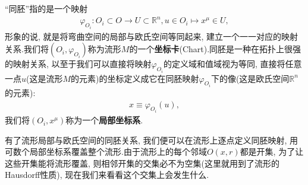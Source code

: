 \begin{remark}
  “同胚”指的是一个映射
  \begin{equation}
    \begin{split}
      \varphi_{O_i}:O_i\subset O\rightarrow U\subset \mathbb{R}^n,u\in O_i\mapsto x^\mu\in U,
    \end{split}
  \end{equation}
  形象的说, 就是将弯曲空间的局部与欧氏空间等同起来, 建立一个一一对应的映射关系.我们将$(O_i,\varphi_{O_i})$称为流形$M$的一个\textbf{坐标卡}(Chart).同胚是一种在拓扑上很强的映射关系, 以至于我们可以直接将映射$\varphi_{O_i}$的定义域和值域视为等同, 直接将任意一点$u$(这是流形$M$的元素)的坐标定义成它在同胚映射$\varphi_{O_i}$下的像(这是欧氏空间$\mathbb{R}^n$的元素):
  \begin{equation}
    \begin{split}
      x\equiv \varphi_{O_i}(u),
    \end{split}
  \end{equation}
  我们将$(O_i,x^\mu)$称为一个\textbf{局部坐标系}.
\end{remark}
有了流形局部与欧氏空间的同胚关系, 我们便可以在流形上逐点定义同胚映射, 用可数个局部坐标系覆盖整个流形.由于流形上的每个邻域$O(x,r)$都是开集, 为了让这些开集能将流形覆盖, 则相邻开集的交集必不为空集(这里就用到了流形的Hausdorff性质), 现在我们来看看这个交集上会发生什么.


